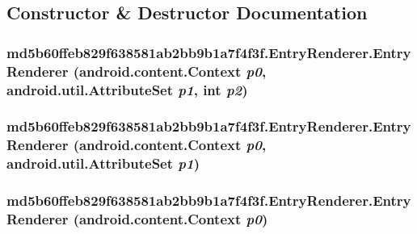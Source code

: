 \subsection{Constructor \& Destructor Documentation}
\hypertarget{classmd5b60ffeb829f638581ab2bb9b1a7f4f3f_1_1_entry_renderer_c9f1e77924196c3ec66c66643a42d20c}{
\subsubsection[{EntryRenderer}]{\setlength{\rightskip}{0pt plus 5cm}md5b60ffeb829f638581ab2bb9b1a7f4f3f.EntryRenderer.EntryRenderer (android.content.Context {\em p0}, \/  android.util.AttributeSet {\em p1}, \/  int {\em p2})}}
\label{classmd5b60ffeb829f638581ab2bb9b1a7f4f3f_1_1_entry_renderer_c9f1e77924196c3ec66c66643a42d20c}


\hypertarget{classmd5b60ffeb829f638581ab2bb9b1a7f4f3f_1_1_entry_renderer_a677f29384a087cba52a19f1109b3bb2}{
\subsubsection[{EntryRenderer}]{\setlength{\rightskip}{0pt plus 5cm}md5b60ffeb829f638581ab2bb9b1a7f4f3f.EntryRenderer.EntryRenderer (android.content.Context {\em p0}, \/  android.util.AttributeSet {\em p1})}}
\label{classmd5b60ffeb829f638581ab2bb9b1a7f4f3f_1_1_entry_renderer_a677f29384a087cba52a19f1109b3bb2}


\hypertarget{classmd5b60ffeb829f638581ab2bb9b1a7f4f3f_1_1_entry_renderer_dacbe769cf67a492a9904d4fe314f4f5}{
\subsubsection[{EntryRenderer}]{\setlength{\rightskip}{0pt plus 5cm}md5b60ffeb829f638581ab2bb9b1a7f4f3f.EntryRenderer.EntryRenderer (android.content.Context {\em p0})}}
\label{classmd5b60ffeb829f638581ab2bb9b1a7f4f3f_1_1_entry_renderer_dacbe769cf67a492a9904d4fe314f4f5}




